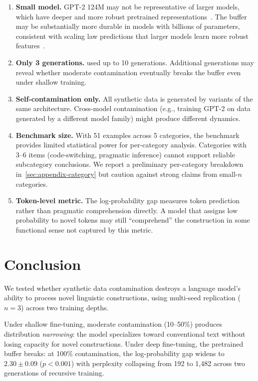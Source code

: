 \documentclass{article}
\begin{document}
\begin{enumerate}[leftmargin=*]
  \item \textbf{Small model.} GPT-2 124M may not be representative of larger models, which have deeper and more robust pretrained representations~\citep{brown2020language,touvron2023llama}. The buffer may be substantially more durable in models with billions of parameters, consistent with scaling law predictions that larger models learn more robust features~\citep{kaplan2020scaling,hoffmann2022training}.
  \item \textbf{Only 3 generations.} \citet{shumailov2024curse} used up to 10 generations. Additional generations may reveal whether moderate contamination eventually breaks the buffer even under shallow training.
  \item \textbf{Self-contamination only.} All synthetic data is generated by variants of the same architecture. Cross-model contamination (e.g., training GPT-2 on data generated by a different model family) might produce different dynamics.
  \item \textbf{Benchmark size.} With 51 examples across 5 categories, the benchmark provides limited statistical power for per-category analysis. Categories with 3--6 items (code-switching, pragmatic inference) cannot support reliable subcategory conclusions. We report a preliminary per-category breakdown in~\cref{sec:appendix-category} but caution against strong claims from small-$n$ categories.
  \item \textbf{Token-level metric.} The log-probability gap measures token prediction rather than pragmatic comprehension directly. A model that assigns low probability to novel tokens may still ``comprehend'' the construction in some functional sense not captured by this metric.
\end{enumerate}

\section{Conclusion}
\label{sec:conclusion}

We tested whether synthetic data contamination destroys a language model's ability to process novel linguistic constructions, using multi-seed replication ($n{=}3$) across two training depths.

Under shallow fine-tuning, moderate contamination (10--50\%) produces distribution \emph{narrowing}: the model specializes toward conventional text without losing capacity for novel constructions.
Under deep fine-tuning, the pretrained buffer breaks: at 100\% contamination, the log-probability gap widens to $2.30 \pm 0.09$ ($p < 0.001$) with perplexity collapsing from 192 to 1{,}482 across two generations of recursive training.
\end{document}
